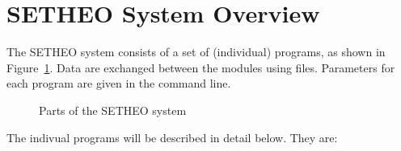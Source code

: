 %

\section{SETHEO System Overview}\label{sec:overwiew}

The SETHEO system consists of a set of (individual) programs,
as shown in Figure~\ref{fig.1}. Data are exchanged between the
modules using files. Parameters for each program are given in the
command line.

\begin{figure}[htb]
\vspace*{8cm}
\caption{Parts of the SETHEO system}
\label{fig.1}
\end{figure}

The indivual programs will be described in detail below. They are:

